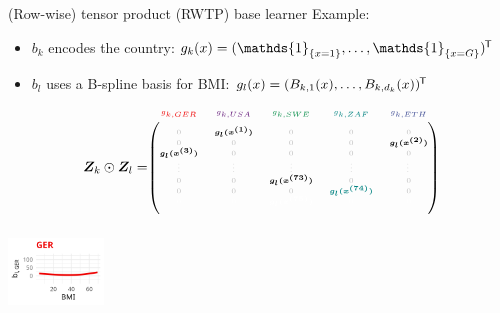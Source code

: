 \documentclass[t,10pt]{beamer}
\begin{document}
\begin{frame}{(Row-wise) tensor product (RWTP) base learner}
  Example:
  \begin{itemize}
    \item $b_k$ encodes the country: $g_k(x) = (\mathds{1}_{\{x = 1\}}, \dots, \mathds{1}_{\{x = G\}})^\tran$
    \item $b_l$ uses a B-spline basis for BMI: $g_l(x) = (B_{k,1}(x), \dots, B_{k,d_k}(x))^{\mkern-1.5mu\mathsf{T}}$
  \end{itemize}
  $$
    \design_k \odot \design_l = \tiny\begin{blockarray}{ccccc}
      \color[HTML]{EE0000}g_{k,GER} & \color[HTML]{631879}g_{k,USA} & \color[HTML]{008B45}g_{k,SWE} & \color[HTML]{008280}g_{k,ZAF} & \color[HTML]{3B4992}g_{k,ETH}\\
    \begin{block}{(ccccc)}
      \phantom{x}\\
      \color{lightgray}0 & \color{black}\bm{g_l(x^{(1)})} & \color{lightgray}0 & \color{lightgray}0 & \color{lightgray}0 \\
      \color{lightgray}0 & \color{lightgray}0 & \color{lightgray}0 & \color{lightgray}0 & \color{black}\bm{g_l(x^{(2)})} \\
      \color{black}\bm{g_l(x^{(3)})} & \color{lightgray}0 & \color{lightgray}0 & \color{lightgray}0 & \color{lightgray}0 \\
      \color{lightgray}\vdots & \color{lightgray}\vdots & \color{lightgray}\vdots & \color{lightgray}\vdots & \color{lightgray}\vdots \\
      \color{lightgray}0 & \color{lightgray}0 & \color{black}\bm{g_l(x^{(73)})} & \color{lightgray}0 & \color{lightgray}0 \\
      \color{lightgray}0 & \color{lightgray}0 & \color{lightgray}0 & \color[HTML]{008280}\bm{g_l(x^{(74)})} & \color{lightgray}0 \\
      \color{white}0 & \color{white}0 & \color{white}\bm{g_l(x^{(75)})} & \color{white}0 & \color{white}0 \\
      \phantom{x}\\
    \end{block}
  \end{blockarray}
  $$
  \normalsize
  {\includegraphics[width=0.19\textwidth]{figures/bs-tensor/fig-tensor-GER.png}}

\end{frame}
\end{document}
